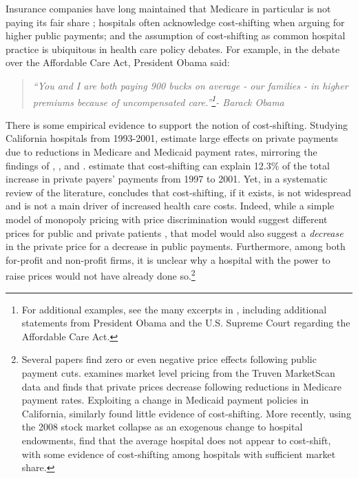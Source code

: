 \documentclass[12pt]{article}
\begin{document}
Insurance companies have long maintained that Medicare in particular is not paying its fair share \citep{frakt2011}; hospitals often acknowledge cost-shifting when arguing for higher public payments; and the assumption of cost-shifting as common hospital practice is ubiquitous in health care policy debates. For example, in the debate over the Affordable Care Act, President Obama said:
\begin{quote}
\textit{``You and I are both paying 900 bucks on average - our families - in higher premiums because of uncompensated care.''\footnote{For additional examples, see the many excerpts in \cite{dranove2017}, including additional statements from President Obama and the U.S. Supreme Court regarding the Affordable Care Act.}- Barack Obama}
\end{quote}
There is some empirical evidence to support the notion of cost-shifting. Studying California hospitals from 1993-2001, \cite{zwanziger2006} estimate large effects on private payments due to reductions in Medicare and Medicaid payment rates, mirroring the findings of \cite{lee2003}, \cite{zwanziger2000}, and \cite{cutler1998costshift}. \cite{zwanziger2006} estimate that cost-shifting can explain 12.3\% of the total increase in private payers' payments from 1997 to 2001.  Yet, in a systematic review of the literature, \citet{frakt2011} concludes that cost-shifting, if it exists, is not widespread and is not a main driver of increased health care costs.  Indeed, while a simple model of monopoly pricing with price discrimination would suggest different prices for public and private patients \citep{hay1983}, that model would also suggest a \textit{decrease} in the private price for a decrease in public payments.  Furthermore, among both for-profit and non-profit firms, it is unclear why a hospital with the power to raise prices would not have already done so.\footnote{Several papers find zero or even negative price effects following public payment cuts. \cite{white2013} examines market level pricing from the Truven MarketScan data and finds that private prices decrease following reductions in Medicare payment rates. Exploiting a change in Medicaid payment policies in California, \citet{dranove1998} similarly found little evidence of cost-shifting. More recently, using the 2008 stock market collapse as an exogenous change to hospital endowments, \cite{dranove2017} find that the average hospital does not appear to cost-shift, with some evidence of cost-shifting among hospitals with sufficient market share.}
\end{document}
